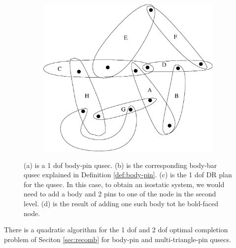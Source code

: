 \begin{figure}
\begin{subfigure}{0.3\linewidth}
\begin{tikzpicture}
    \end{tikzpicture}
    \caption{}
\end{subfigure}
\begin{subfigure}{0.2\linewidth}\centering
    \includegraphics[width=\linewidth]{img/bodypin2}
    \caption{}
\end{subfigure}

    
\caption{(a) is a 1 dof body-pin qusec. (b) is the corresponding body-bar qusec explained in Definition \ref{def:body-pin}. (c) is the 1 dof DR plan for the qusec. In this case, to obtain an isostatic system, we would need to add a body and 2 pins to one of the node in the second level. (d) is the result of adding one such body tot he bold-faced node.}

\end{figure}

\begin{theorem}
    There is a quadratic algorithm for the 1 dof and 2 dof optimal completion problem of Seciton \ref{sec:recomb} for body-pin and multi-triangle-pin qusecs.
\end{theorem}

